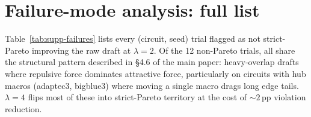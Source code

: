 \documentclass{article}
\begin{document}
\begin{table}[h]
\centering
\small

\caption{Component ablation, mean $\pm$ std over 18 (circuit, seed) pairs.
Same as main paper Table~6.  Raw data: \texttt{results/vsr\_extra/component\_ablation.json}.}
\label{tab:supp-component}
\end{table}

\section{Failure-mode analysis: full list}
\label{sec:supp-failures}

Table~\ref{tab:supp-failures} lists every (circuit, seed) trial flagged as
not strict-Pareto improving the raw draft at $\lambda=2$.  Of the 12
non-Pareto trials, all share the structural pattern described in
\S4.6 of the main paper: heavy-overlap drafts where repulsive force
dominates attractive force, particularly on circuits with hub macros
(adaptec3, bigblue3) where moving a single macro drags long edge tails.
$\lambda=4$ flips most of these into strict-Pareto territory at the cost of
$\sim 2$\,pp violation reduction.
\end{document}
